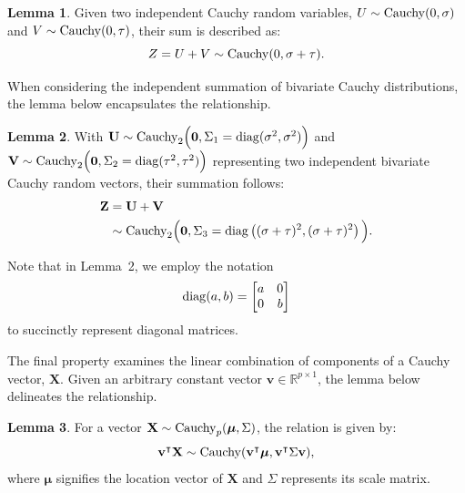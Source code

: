 \documentclass[conference]{IEEEtran}
\newcommand{\R}{\mathbb{R}}
\theoremstyle{definition}
\newtheorem{lma}{Lemma}
\theoremstyle{plain}
\begin{document}
\begin{lma}
Given two independent Cauchy random variables, $U \sim {\rm Cauchy}(0,\sigma)$ and $V \sim {\rm Cauchy}(0,\tau)$, their sum is described as:
\begin{equation}
Z = U + V \sim {\rm Cauchy}(0,\sigma+\tau).    
\end{equation}
\label{lma:L1}
\end{lma}
\noindent When considering the independent summation of bivariate Cauchy distributions, the lemma below encapsulates the relationship.

\begin{lma}
With $\mathbf{U} \sim {\rm Cauchy}_2\Big(\mathbf{0},\Sigma_1={\rm diag}(\sigma^2,\sigma^2)\Big)$ and $\mathbf{V} \sim {\rm Cauchy}_2\Big(\mathbf{0},\Sigma_2={\rm diag}(\tau^2,\tau^2)\Big)$ representing two independent bivariate Cauchy random vectors, their summation follows:
\begin{align}
\begin{split}
\mathbf{Z} &= \mathbf{U} + \mathbf{V} \\
&\sim {\rm Cauchy}_2\Big(\mathbf{0},\Sigma_3={\rm diag}\left((\sigma+\tau)^2,(\sigma+\tau)^2\right)\Big).
\end{split}
\end{align}
\label{lma:L2}
\end{lma}
\noindent Note that in Lemma~2, we employ the notation
\begin{equation}
{\rm diag}(a,b) =
\begin{bmatrix}
a & 0 \\
0 & b
\end{bmatrix}
\end{equation}
to succinctly represent diagonal matrices.

The final property examines the linear combination of components of a Cauchy vector, \(\mathbf{X}\). Given an arbitrary constant vector \(\mathbf{v} \in \R^{p \times 1}\), the lemma below delineates the relationship.

\begin{lma}
For a vector $\mathbf{X} \sim {\rm Cauchy}_p(\boldsymbol\mu,\Sigma)$, the relation is given by:
\begin{equation}
\mathbf{v}^\intercal \mathbf{X}
\sim {\rm Cauchy}(\mathbf{v}^\intercal \boldsymbol\mu,
\mathbf{v}^\intercal \Sigma \mathbf{v}),
\end{equation}
where \(\boldsymbol{\mu}\) signifies the location vector of \(\mathbf{X}\) and \(\Sigma\) represents its scale matrix.
\label{lma:L3}
\end{lma}
\color{black}
\end{document}
